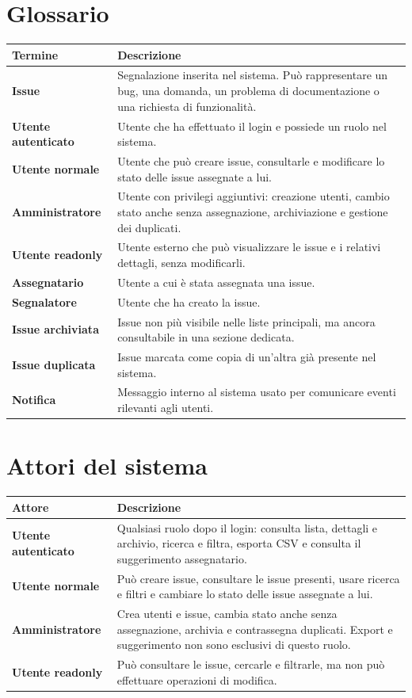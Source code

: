 \documentclass[12pt,a4paper]{article}
\begin{document}
\section{Glossario}

\begin{longtable}{>{\bfseries}p{} p{}}
\toprule
Termine & Descrizione \\
\midrule
Issue & Segnalazione inserita nel sistema. Può rappresentare un bug, una domanda, un problema di documentazione o una richiesta di funzionalità. \\
Utente autenticato & Utente che ha effettuato il login e possiede un ruolo nel sistema. \\
Utente normale & Utente che può creare issue, consultarle e modificare lo stato delle issue assegnate a lui. \\
Amministratore & Utente con privilegi aggiuntivi: creazione utenti, cambio stato anche senza assegnazione, archiviazione e gestione dei duplicati. \\
Utente readonly & Utente esterno che può visualizzare le issue e i relativi dettagli, senza modificarli. \\
Assegnatario & Utente a cui è stata assegnata una issue. \\
Segnalatore & Utente che ha creato la issue. \\
Issue archiviata & Issue non più visibile nelle liste principali, ma ancora consultabile in una sezione dedicata. \\
Issue duplicata & Issue marcata come copia di un'altra già presente nel sistema. \\
Notifica & Messaggio interno al sistema usato per comunicare eventi rilevanti agli utenti. \\
\bottomrule
\end{longtable}

\section{Attori del sistema}

\begin{center}
\begin{tabularx}{\textwidth}{>{\bfseries}p{} X}
\toprule
Attore & Descrizione \\
\midrule
Utente autenticato & Qualsiasi ruolo dopo il login: consulta lista, dettagli e archivio, ricerca e filtra, esporta CSV e consulta il suggerimento assegnatario. \\
Utente normale & Può creare issue, consultare le issue presenti, usare ricerca e filtri e cambiare lo stato delle issue assegnate a lui. \\
Amministratore & Crea utenti e issue, cambia stato anche senza assegnazione, archivia e contrassegna duplicati. Export e suggerimento non sono esclusivi di questo ruolo. \\
Utente readonly & Può consultare le issue, cercarle e filtrarle, ma non può effettuare operazioni di modifica. \\
\bottomrule
\end{tabularx}
\end{center}
\end{document}
